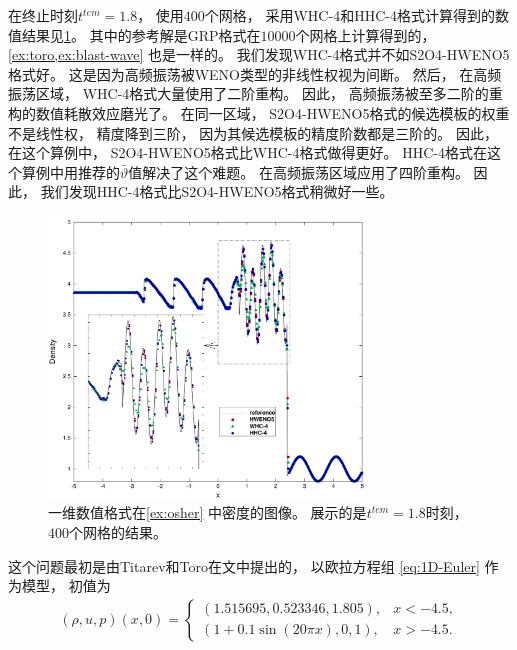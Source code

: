 在终止时刻$t^{tem}=1.8$，
使用$400$个网格，
采用WHC-4和HHC-4格式计算得到的数值结果见\cref{fig:3_1}。
其中的参考解是GRP格式在$10000$个网格上计算得到的，
\cref{ex:toro,ex:blast-wave} 也是一样的。
我们发现WHC-4格式并不如S2O4-HWENO5格式好。
这是因为高频振荡被WENO类型的非线性权视为间断。
然后，
在高频振荡区域，
WHC-4格式大量使用了二阶重构。
因此，
高频振荡被至多二阶的重构的数值耗散效应磨光了。
在同一区域，
S2O4-HWENO5格式的候选模板的权重不是线性权，
精度降到三阶，
因为其候选模板的精度阶数都是三阶的。
因此，
在这个算例中，
S2O4-HWENO5格式比WHC-4格式做得更好。
HHC-4格式在这个算例中用推荐的$\bar\vartheta$值解决了这个难题。
在高频振荡区域应用了四阶重构。
因此，
我们发现HHC-4格式比S2O4-HWENO5格式稍微好一些。

\begin{figure}[htbp]
  \centering
  \includegraphics[width=0.75\textwidth]{fig/1D/Ex3.pdf}
  \caption{一维数值格式在\cref{ex:osher} 中密度的图像。
    展示的是$t^{tem} = 1.8$时刻，
    $400$个网格的结果。
  }
  \label{fig:3_1}
\end{figure}

\begin{example}
  \label{ex:toro}
  这个问题最初是由Titarev和Toro在文\cite{ToroProblem}中提出的，
  以欧拉方程组 \cref{eq:1D-Euler} 作为模型，
  初值为
  \begin{equation}
    \begin{aligned}
      (\rho, u, p)(x,0)=
      \begin{cases}
        (1.515695,0.523346,1.805),  & x<-4.5,  \\
        (1 + 0.1\sin(20\pi x),0,1), & x>-4.5.
      \end{cases}
    \end{aligned}
  \end{equation}
\end{example}

